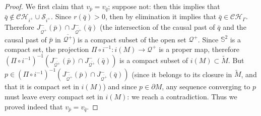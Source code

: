 \documentclass[10pt,a4paper]{article}
\theoremstyle{plain}
\theoremstyle{remark}
\theoremstyle{definition}
\theoremstyle{plain}
\theoremstyle{remark}
\theoremstyle{definition}
\newcommand{\CH}{\mathcal{CH}_{i^+}}
\numberwithin{equation}{section}
\begin{document}
\begin{proof}
   We first claim that $v_{\bar{p}}=v_{\bar{q}}$; suppose not: then this implies that $\bar{q} \notin \CH \cup \mathcal{S}_{i^+} $. Since $r(\bar{q})>0$, then by elimination it implies that $\bar{q} \in \mathcal{CH}_{\Gamma}$. Therefore $J^{-}_{\overline{\mathcal{Q}^+}}(\bar{p}) \cap J^{-}_{\overline{\mathcal{Q}^+}}(\bar{q})$ (the intersection of the causal past of $\bar{q}$ and the causal past of $\bar{p}$ in $\overline{\mathcal{Q}^+}$) is a compact subset of the open set $\mathcal{Q}^+$. Since $\mathbb{S}^2$ is a compact set, the projection $\Pi \circ i^{-1} : i(M) \rightarrow \mathcal{Q}^+$ is a proper map, therefore $(\Pi \circ i^{-1})^{-1}(J^{-}_{\overline{\mathcal{Q}^+}}(\bar{p}) \cap J^{-}_{\overline{\mathcal{Q}^+}}(\bar{q}))$ is a compact subset of $i(M) \subset \tilde{M}$. But $p  \in(\Pi \circ i^{-1})^{-1}(J^{-}_{\overline{\mathcal{Q}^+}}(\bar{p}) \cap J^{-}_{\overline{\mathcal{Q}^+}}(\bar{q}))$ (since it belongs to its closure in $\tilde{M}$, and that it is compact set in $i(M)$) and since $p\in \partial M$, any sequence converging to $p$ must leave every compact set in $i(M)$: we reach a contradiction. Thus we proved indeed that $v_{\bar{p}}=v_{\bar{q}}$.
   
   

\end{proof}
\end{document}
